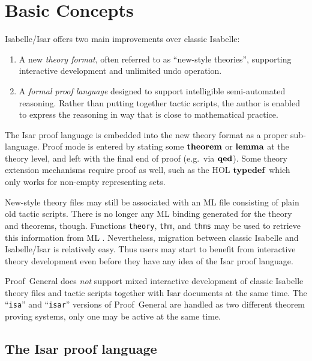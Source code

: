 
\chapter{Basic Concepts}\label{ch:basics}

Isabelle/Isar offers two main improvements over classic Isabelle:
\begin{enumerate}
\item A new \emph{theory format}, often referred to as ``new-style theories'',
  supporting interactive development and unlimited undo operation.
\item A \emph{formal proof language} designed to support intelligible
  semi-automated reasoning.  Rather than putting together tactic scripts, the
  author is enabled to express the reasoning in way that is close to
  mathematical practice.
\end{enumerate}

The Isar proof language is embedded into the new theory format as a proper
sub-language.  Proof mode is entered by stating some ${\mathord{\mathbf{theorem}}}$ or
${\mathord{\mathbf{lemma}}}$ at the theory level, and left with the final end of proof (e.g.\ 
via ${\mathord{\mathbf{qed}}}$).  Some theory extension mechanisms require proof as well, such
as the HOL ${\mathord{\mathbf{typedef}}}$ which only works for non-empty representing
sets.

New-style theory files may still be associated with an ML file consisting of
plain old tactic scripts.  There is no longer any ML binding generated for the
theory and theorems, though.  Functions \texttt{theory}, \texttt{thm}, and
\texttt{thms} may be used to retrieve this information from ML
\cite{isabelle-ref}.  Nevertheless, migration between classic Isabelle and
Isabelle/Isar is relatively easy.  Thus users may start to benefit from
interactive theory development even before they have any idea of the Isar
proof language.

\begin{warn}
  Proof~General does \emph{not} support mixed interactive development of
  classic Isabelle theory files and tactic scripts together with Isar
  documents at the same time.  The ``\texttt{isa}'' and ``\texttt{isar}''
  versions of Proof~General are handled as two different theorem proving
  systems, only one may be active at the same time.
\end{warn}


\section{The Isar proof language}


